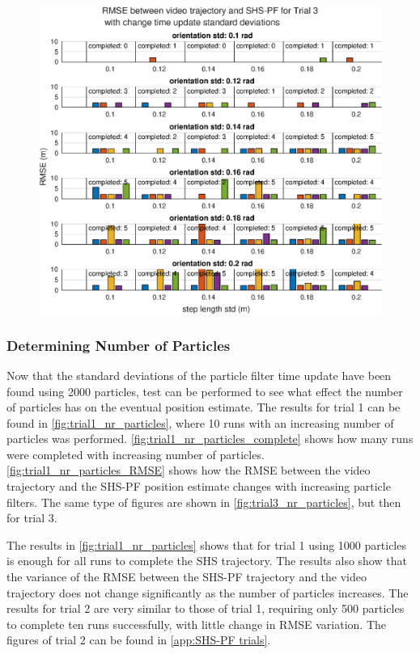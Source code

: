 \begin{figure}[H]
	\centering
	\includegraphics[width=0.85\linewidth]{images/20201201_1326_parameter_search_trial3_1}
	\caption{}
	\label{fig:rmse_between_video_trajectory_andshs-pf_for_trial_3_1}
\end{figure}

\subsubsection{Determining Number of Particles}
\label{key}
Now that the standard deviations of the particle filter time update have been found using 2000 particles, test can be performed to see what effect the number of particles has on the eventual position estimate. The results for trial 1 can be found in \cref{fig:trial1_nr_particles}, where 10 runs with an increasing number of particles was performed.  \cref{fig:trial1_nr_particles_complete} shows how many runs were completed with increasing number of particles. \cref{fig:trial1_nr_particles_RMSE} shows how the RMSE between the video trajectory and the SHS-PF position estimate changes with increasing particle filters. The same type of figures are shown in \cref{fig:trial3_nr_particles}, but then for trial 3. \par 

The results in \cref{fig:trial1_nr_particles} shows that for trial 1 using 1000 particles is enough for all runs to complete the SHS trajectory. The results also show that the variance of the RMSE between the SHS-PF trajectory and the video trajectory does not change significantly as the number of particles increases. The results for trial 2 are very similar to those of trial 1, requiring only 500 particles to complete ten runs successfully, with little change in RMSE variation. The figures of trial 2 can be found in \cref{app:SHS-PF trials}.\par
 
